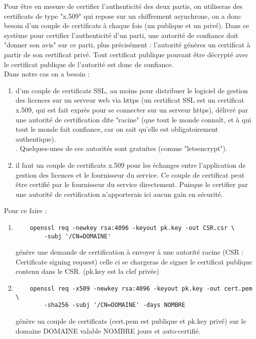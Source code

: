 \documentclass{article}
\begin{document}
Pour être en mesure de certifier l'authenticité des deux partis, on utiliseras des certificats de type "x.509" qui repose sur un chiffrement asynchrone, on a donc besoin d'un couple de certificats à chaque fois (un publique et un privé). Dans ce système pour certifier l'authenticité d'un parti, une autorité de confiance doit "donner son avis" sur ce parti, plus précisément : l'autorité génères un certificat à partir de son certificat privé. Tout certificat publique pouvant être décrypté avec le certificat publique de l'autorité est donc de confiance. \\
Dans notre cas on a besoin : 
\begin{enumerate}
    \item d'un couple de certificats SSL, au moins pour distribuer le logiciel de gestion des licences sur un serveur web via https (un certificat SSL est un certificat x.509, qui est fait exprès pour se connecter sur un serveur https), délivré par une autorité de certification dite "racine" (que tout le monde connaît, et à qui tout le monde fait confiance, car on sait qu'elle est obligatoirement authentique).\\ . Quelques-unes de ces autorités sont gratuites (comme "letsencrypt").
    \item il faut un couple de certificats x.509 pour les échanges entre l'application de gestion des licences et le fournisseur du service. Ce couple de certificat peut être certifié par le fournisseur du service directement. Puisque le certifier par une autorité de certification n'apporterais ici aucun gain en sécurité.
\end{enumerate}

Pour ce faire :

\begin{enumerate}
    \item \begin{verbatim}
    openssl req -newkey rsa:4096 -keyout pk.key -out CSR.csr \
        -subj '/CN=DOMAINE'
    \end{verbatim}
    génère une demande de certification à envoyer à une autorité racine (CSR : Certificate signing request) celle ci se chargeras de signer le certificat publique contenu dans le CSR. (pk.key est la clef privée)
    \item \begin{verbatim}
    openssl req -x509 -newkey rsa:4096 -keyout pk.key -out cert.pem \
        -sha256 -subj '/CN=DOMAINE' -days NOMBRE
    \end{verbatim}
    génère un couple de certificats (cert.pem est publique et pk.key privé) sur le domaine DOMAINE valable NOMBRE jours et auto-certifié.
\end{enumerate}
\end{document}
